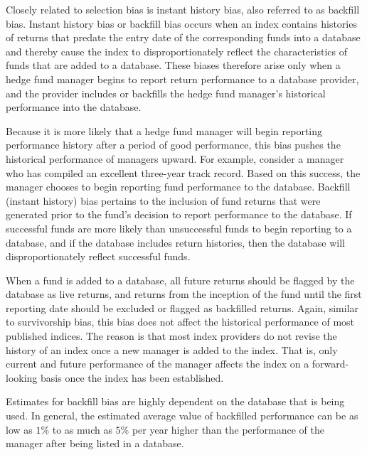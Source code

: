 \documentclass[11pt]{article}
\begin{document}
Closely related to selection bias is instant history bias, also referred to as backfill bias. Instant history bias or backfill bias occurs when an index contains histories of returns that predate the entry date of the corresponding funds into a database and thereby cause the index to disproportionately reflect the characteristics of funds that are added to a database. These biases therefore arise only when a hedge fund manager begins to report return performance to a database provider, and the provider includes or backfills the hedge fund manager's historical performance into the database.

Because it is more likely that a hedge fund manager will begin reporting performance history after a period of good performance, this bias pushes the historical performance of managers upward. For example, consider a manager who has compiled an excellent three-year track record. Based on this success, the manager chooses to begin reporting fund performance to the database. Backfill (instant history) bias pertains to the inclusion of fund returns that were generated prior to the fund's decision to report performance to the database. If successful funds are more likely than unsuccessful funds to begin reporting to a database, and if the database includes return histories, then the database will disproportionately reflect successful funds.

When a fund is added to a database, all future returns should be flagged by the database as live returns, and returns from the inception of the fund until the first reporting date should be excluded or flagged as backfilled returns. Again, similar to survivorship bias, this bias does not affect the historical performance of most published indices. The reason is that most index providers do not revise the history of an index once a new manager is added to the index. That is, only current and future performance of the manager affects the index on a forward-looking basis once the index has been established.

Estimates for backfill bias are highly dependent on the database that is being used. In general, the estimated average value of backfilled performance can be as low as $1 \%$ to as much as $5 \%$ per year higher than the performance of the manager after being listed in a database.
\end{document}
